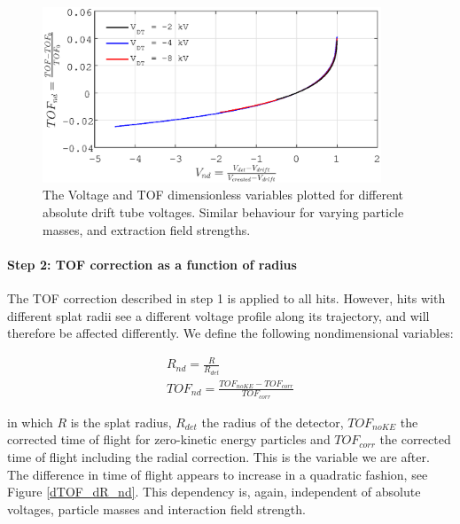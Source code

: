 \begin{figure}[h]
   \centering
    \centerline{\includegraphics[width=0.9\textwidth]{Graphics/dTOF_vs_dV_dT_-8_-4_-2kV.eps}}
\caption{The Voltage and TOF dimensionless variables plotted for different absolute drift tube voltages. Similar behaviour for varying particle masses, and extraction field strengths.}
\label{dTOF_vs_dV}
\end{figure}

\paragraph{Step 2: TOF correction as a function of radius}
The TOF correction described in step 1 is applied to all hits. However, hits with different splat radii see a different voltage profile along its trajectory, and will therefore be affected differently. We define the following nondimensional variables:

\begin{align}
R_{nd} 		= \frac{R}{R_{det}}\\
TOF_{nd} 	= \frac{TOF_{noKE} - TOF_{corr}}{TOF_{corr}}
\end{align}

in which $R$ is the splat radius, $R_{det}$ the radius of the detector, $TOF_{noKE}$ the corrected time of flight for zero-kinetic energy particles and ${TOF_{corr}}$ the corrected time of flight including the radial correction. This is the variable we are after. The difference in time of flight appears to increase in a quadratic fashion, see Figure \ref{dTOF_dR_nd}. This dependency is, again, independent of absolute voltages, particle masses and interaction field strength. 


